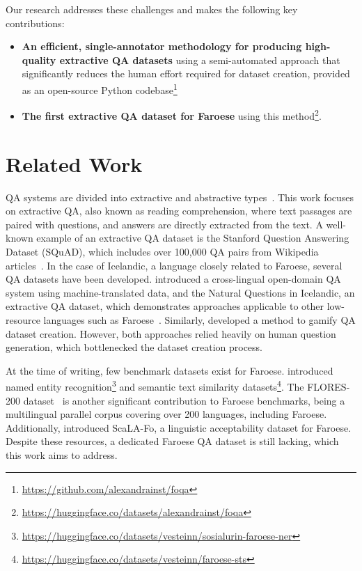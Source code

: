 \documentclass[11pt]{article}
\newcommand{\githuburl}{\url{https://github.com/alexandrainst/foqa}}
\newcommand{\hfurl}{\url{https://huggingface.co/datasets/alexandrainst/foqa}}
\begin{document}
Our research addresses these challenges and makes the following key contributions:

\begin{itemize}
    \item \textbf{An efficient, single-annotator methodology for producing high-quality
      extractive QA datasets} using a semi-automated approach that significantly reduces
      the human effort required for dataset creation, provided as an open-source Python
      codebase\footnote{\githuburl}
    \item \textbf{The first extractive QA dataset for Faroese} using this
      method\footnote{\hfurl}.
\end{itemize}

\section{Related Work}
\label{sec:related_work}

QA systems are divided into extractive and abstractive types~\cite{fan-etal-2019-eli5}.
This work focuses on extractive QA, also known as reading comprehension, where text
passages are paired with questions, and answers are directly extracted from the text. A
well-known example of an extractive QA dataset is the Stanford Question Answering
Dataset (SQuAD), which includes over 100,000 QA pairs from Wikipedia
articles~\cite{rajpurkar2016squad}. In the case of Icelandic, a language closely related
to Faroese, several QA datasets have been developed.
\citet{snaebjarnarson-einarsson-2022-cross} introduced a cross-lingual open-domain QA
system using machine-translated data, and the Natural Questions in Icelandic, an
extractive QA dataset, which demonstrates approaches applicable to other low-resource
languages such as Faroese~\cite{snaebjarnarson-einarsson-2022-natural}. Similarly,
\citet{skarphedinsson-etal-2023-gameqa} developed a method to gamify QA dataset
creation. However, both approaches relied heavily on human question generation, which
bottlenecked the dataset creation process.

At the time of writing, few benchmark datasets exist for Faroese.
\citet{snaebjarnarson-etal-2023-transfer} introduced named entity
recognition\footnote{\url{https://huggingface.co/datasets/vesteinn/sosialurin-faroese-ner}}
and semantic text similarity
datasets\footnote{\url{https://huggingface.co/datasets/vesteinn/faroese-sts}}. The
FLORES-200 dataset~\cite{nllb2022} is another significant contribution to Faroese
benchmarks, being a multilingual parallel corpus covering over 200 languages, including
Faroese. Additionally, \citet{nielsen2023scandeval} introduced ScaLA-Fo, a linguistic
acceptability dataset for Faroese. Despite these resources, a dedicated Faroese QA
dataset is still lacking, which this work aims to address.
\end{document}
